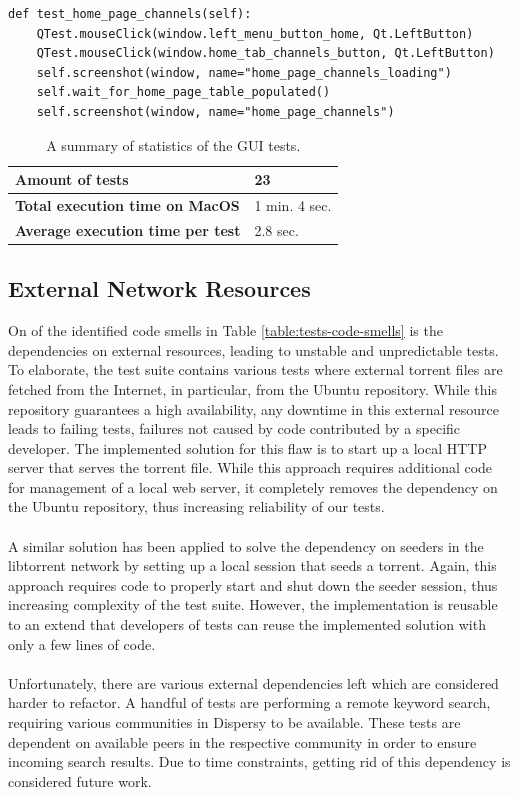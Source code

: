 \begin{lstlisting}[caption={An example of a test that tests the new Qt Tribler GUI.},label={lst:qtest-sample}]
def test_home_page_channels(self):
	QTest.mouseClick(window.left_menu_button_home, Qt.LeftButton)
	QTest.mouseClick(window.home_tab_channels_button, Qt.LeftButton)
	self.screenshot(window, name="home_page_channels_loading")
	self.wait_for_home_page_table_populated()
	self.screenshot(window, name="home_page_channels")
\end{lstlisting}

\begin{table}[h!]
	\centering
	\begin{tabular}{|l|l|}
		\hline
		\textbf{Amount of tests} & 23 \\ \hline
		\textbf{Total execution time on MacOS} & 1 min. 4 sec. \\ \hline
		\textbf{Average execution time per test} & 2.8 sec.\\ \hline
	\end{tabular}
	\caption{A summary of statistics of the GUI tests.}
	\label{table:gui-tests-summary}
\end{table}

\subsection{External Network Resources}
\label{subsec:external-network-resources}
On of the identified code smells in Table \ref{table:tests-code-smells} is the dependencies on external resources, leading to unstable and unpredictable tests. To elaborate, the test suite contains various tests where external torrent files are fetched from the Internet, in particular, from the Ubuntu repository. While this repository guarantees a high availability, any downtime in this external resource leads to failing tests, failures not caused by code contributed by a specific developer. The implemented solution for this flaw is to start up a local HTTP server that serves the torrent file. While this approach requires additional code for management of a local web server, it completely removes the dependency on the Ubuntu repository, thus increasing reliability of our tests.\\\\
A similar solution has been applied to solve the dependency on seeders in the libtorrent network by setting up a local session that seeds a torrent. Again, this approach requires code to properly start and shut down the seeder session, thus increasing complexity of the test suite. However, the implementation is reusable to an extend that developers of tests can reuse the implemented solution with only a few lines of code.\\\\
Unfortunately, there are various external dependencies left which are considered harder to refactor. A handful of tests are performing a remote keyword search, requiring various communities in Dispersy to be available. These tests are dependent on available peers in the respective community in order to ensure incoming search results. Due to time constraints, getting rid of this dependency is considered future work.

